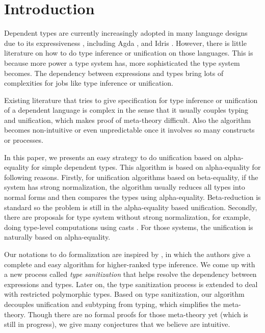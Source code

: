 \section{Introduction}

Dependent types are currently increasingly adopted in many language
designs due to its expressiveness \cite{xi1999dependent, licata2005formulation,
  pasalic2006concoqtion, mckinna2006dependent}, including Agda
\cite{norell2009dependently}, and Idris \cite{brady2013idris}.
However, there is little literature on
how to do type inference or unification on those languages. This is because
more power a type system has, more sophisticated the type system
becomes. The dependency between expressions and types bring lots of complexities
for jobs like type inference or unification.

Existing literature \cite{ziliani2015unification}
that tries to give specification for type inference
or unification of
a dependent language is complex in the sense that it usually couples typing
and unification, which makes proof of meta-theory difficult.
Also the algorithm becomes non-intuitive or even unpredictable once it involves
so many constructs or processes.

In this paper, we presents an easy strategy to do unification based on
alpha-equality for simple dependent
types. This algorithm is based on alpha-equality for following reasons. Firstly,
for unification algorithms based on beta-equality, if the system has strong
normalization, the algorithm usually reduces all types into normal forms and
then compares the types using
alpha-equality. Beta-reduction is standard so the problem is still in the
alpha-equality based unification.
Secondly, there are proposals for type system without strong
normalization, for example, doing type-level computations using casts
\cite{van2013explicit, kimmell2012equational, sjoberg2012irrelevance}
. For
those systems, the unification is naturally based on alpha-equality.

Our notations to do formalization are inspired by \cite{dunfield2013complete},
in which the authors give a complete
and easy algorithm for higher-ranked type inference. We come up with a new
process called \textit{type sanitization} that helps resolve the dependency
between expressions and types. Later on, the type sanitization process is
extended to deal with restricted polymorphic types.
Based on type sanitization, our algorithm
decouples unification and subtyping from typing, which simplifies the
meta-theory. Though there are no formal proofs for those meta-theory yet (which
is still in progress),
we give many conjectures that we believe are intuitive.

